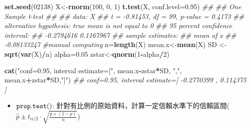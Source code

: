 \documentclass[hyperref,]{ctexart}
\newenvironment{Shaded}{\begin{snugshade}}{\end{snugshade}}
\newcommand{\CommentTok}[1]{\textcolor[rgb]{0.56,0.35,0.01}{\textit{#1}}}
\newcommand{\DataTypeTok}[1]{\textcolor[rgb]{0.13,0.29,0.53}{#1}}
\newcommand{\DecValTok}[1]{\textcolor[rgb]{0.00,0.00,0.81}{#1}}
\newcommand{\FloatTok}[1]{\textcolor[rgb]{0.00,0.00,0.81}{#1}}
\newcommand{\KeywordTok}[1]{\textcolor[rgb]{0.13,0.29,0.53}{\textbf{#1}}}
\newcommand{\NormalTok}[1]{#1}
\newcommand{\OperatorTok}[1]{\textcolor[rgb]{0.81,0.36,0.00}{\textbf{#1}}}
\newcommand{\StringTok}[1]{\textcolor[rgb]{0.31,0.60,0.02}{#1}}
\providecommand{\tightlist}{%
  \setlength{\itemsep}{0pt}\setlength{\parskip}{0pt}}
\begin{document}
\begin{Shaded}
\begin{Highlighting}[]
\KeywordTok{set.seed}\NormalTok{(}\DecValTok{02138}\NormalTok{)}
\NormalTok{X<-}\KeywordTok{rnorm}\NormalTok{(}\DecValTok{100}\NormalTok{, }\DecValTok{0}\NormalTok{, }\DecValTok{1}\NormalTok{)}
\KeywordTok{t.test}\NormalTok{(X, }\DataTypeTok{conf.level=}\FloatTok{0.95}\NormalTok{)}
\CommentTok{## }
\CommentTok{##  One Sample t-test}
\CommentTok{## }
\CommentTok{## data:  X}
\CommentTok{## t = -0.81453, df = 99, p-value = 0.4173}
\CommentTok{## alternative hypothesis: true mean is not equal to 0}
\CommentTok{## 95 percent confidence interval:}
\CommentTok{##  -0.2794616  0.1167967}
\CommentTok{## sample estimates:}
\CommentTok{##   mean of x }
\CommentTok{## -0.08133247}
\CommentTok{#manual computing}
\NormalTok{n=}\KeywordTok{length}\NormalTok{(X)}
\NormalTok{mean.x<-}\KeywordTok{mean}\NormalTok{(X)}
\NormalTok{SD <-}\StringTok{ }\KeywordTok{sqrt}\NormalTok{(}\KeywordTok{var}\NormalTok{(X)}\OperatorTok{/}\NormalTok{n)}
\NormalTok{alpha=}\FloatTok{0.05}
\NormalTok{zstar<-}\KeywordTok{qnorm}\NormalTok{(}\DecValTok{1}\OperatorTok{-}\NormalTok{alpha}\OperatorTok{/}\DecValTok{2}\NormalTok{)}

\KeywordTok{cat}\NormalTok{(}\StringTok{"conf=0.95, interval estimate=["}\NormalTok{, mean.x}\OperatorTok{-}\NormalTok{zstar}\OperatorTok{*}\NormalTok{SD, }\StringTok{","}\NormalTok{, }
\NormalTok{         mean.x}\OperatorTok{+}\NormalTok{zstar}\OperatorTok{*}\NormalTok{SD,}\StringTok{"]"}\NormalTok{)}
\CommentTok{## conf=0.95, interval estimate=[ -0.2770399 , 0.114375 ]}
\end{Highlighting}
\end{Shaded}

\begin{itemize}
\tightlist
\item
  \(\tt{prop.test()}\):
  針對有比例的原始資料，計算一定信賴水準下的信賴區間(\(\hat{p}\pm t_{\alpha/2}\cdot \sqrt{\frac{p\times(1-p)}{n}}\))
\end{itemize}
\end{document}
